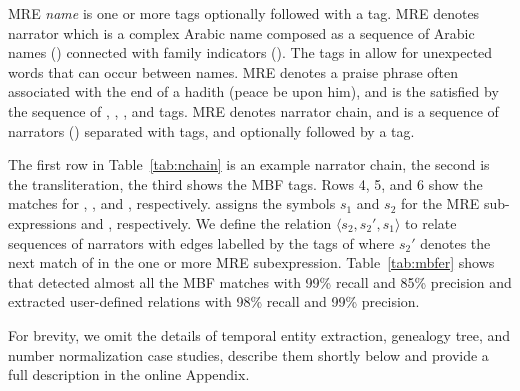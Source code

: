 MRE {\em name} is one or more  tags optionally followed 
with a  tag. 
MRE  denotes narrator which is a complex Arabic name
composed as a sequence of Arabic names () 
connected with family indicators (). 
The  tags in  allow for unexpected words 
that can occur between names. 
MRE  denotes a praise phrase often associated with 
the end of a hadith (peace be upon him), 
and is the satisfied by the sequence of
, , , and  tags. 
MRE  denotes narrator chain, 
and is a sequence of narrators ()
separated with  tags, and optionally followed
by a  tag. 

The first row in Table~\ref{tab:nchain} is an example narrator chain,
the second is the transliteration, the third 
shows the MBF tags. Rows 4, 5, and 6 show the 
matches for , , and ,
respectively.
%
\framework assigns the symbols $s_1$ and $s_2$ for the 
MRE sub-expressions  and , respectively. 
We define the relation $\langle s_2,s_2',s_1\rangle$ 
to relate sequences of narrators with edges labelled by the tags of  where 
$s_2'$ denotes the next match of  in the one or more MRE subexpression.
%
Table~\ref{tab:mbfer} shows that \framework detected almost all the MBF matches 
with 99\% recall and 85\% precision and 
extracted user-defined relations with 98\% recall and 99\% precision.

For brevity, we omit the details of \framework temporal entity extraction, 
genealogy tree, and number normalization case studies, describe them shortly
below and provide a full description in the online Appendix.

